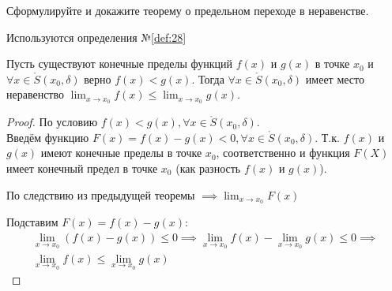 \begin{question}
    Сформулируйте и докажите теорему о предельном переходе в неравенстве.
\end{question}
\begin{used}
    Используются определения №\ref{def:28}
\end{used}
\begin{theorem}
    Пусть существуют конечные пределы функций $f(x)$ и  $g(x)$ в точке $x_0$ и $\forall x \in \mathring{S}(x_0, \delta)$ верно $f(x) < g(x)$. Тогда $\forall x \in \mathring{S}(x_0, \delta)$ имеет место неравенство $\lim_{x \to x_0} f(x) \le \lim_{x \to x_0} g(x)$.
\end{theorem}
\begin{proof}
    По условию $f(x) < g(x), \forall x \in \mathring{S}(x_0, \delta)$. \\
    Введём функцию $F(x) = f(x) - g(x) < 0, \forall x \in \mathring{S}(x_0, \delta)$. 
    Т.к. $f(x)$ и $g(x)$ имеют конечные пределы в точке $x_0$, соответственно и функция $F(X)$ имеет конечный предел в точке $x_0$ (как разность $f(x)$ и $g(x)$).
  
    По следствию из предыдущей теоремы
    $\implies \lim_{x \to x_0} F(x) $ 
  
    Подставим $F(x) = f(x) - g(x)$:
    \begin{gather*}
        \lim_{x \to x_0} \left( f(x) - g(x) \right) \le 0 \implies \lim_{x \to x_0} f(x) - \lim_{x \to x_0} g(x) \le 0 \implies \\
        \lim_{x \to x_0} f(x) \le \lim_{x \to x_0} g(x) 
    \end{gather*}
\end{proof}



